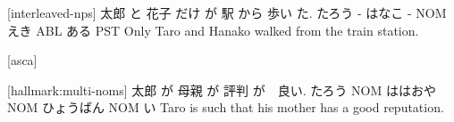 [interleaved-nps]
太郎  と 花子  だけ が  駅  から 歩い  た.
たろう - はなこ -  NOM えき ABL ある  PST
Only Taro and Hanako walked from the train station.

[asca]

[hallmark:multi-noms]
太郎  が   母親    が   評判      が　良い.
たろう NOM ははおや NOM ひょうばん NOM い
Taro is such that his mother has a good reputation.
